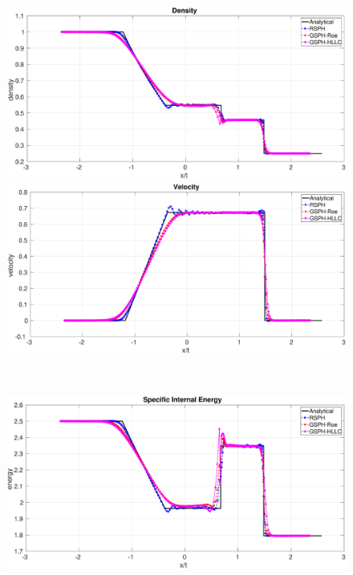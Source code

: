 \documentclass[review]{elsarticle}
\begin{document}
\begin{figure}[htp]
    \centering
    \begin{minipage}{.495\textwidth}
        \centering
        \includegraphics[width=0.99 \textwidth,height=0.6\textwidth]{./Figures/Sod/RCM-Sod-GSPH-compare-rho}
    \end{minipage}%
    \begin{minipage}{.495 \textwidth}
        \centering
        \includegraphics[width=0.99 \textwidth,height=0.6\textwidth]{./Figures/Sod/RCM-Sod-GSPH-compare-v}
    \end{minipage}%
    \\
    \begin{minipage}{.495\textwidth}
        \centering
        \includegraphics[width=0.99 \textwidth,height=0.6\textwidth]{./Figures/Sod/RCM-Sod-GSPH-compare-e}

\end{minipage}
\end{figure}
\end{document}
